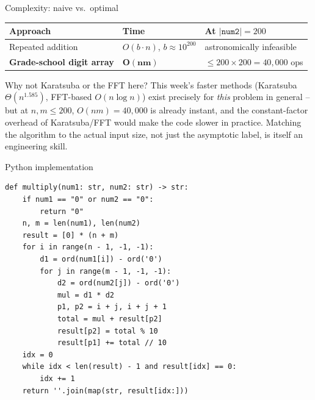 \documentclass[11pt,aspectratio=169]{beamer}
\begin{document}
\begin{frame}{Complexity: naive vs.\ optimal}
  \begin{center}
  \begin{tabular}{@{}lll@{}}
    \toprule
    Approach & Time & At $|\texttt{num2}|=200$ \\
    \midrule
    Repeated addition & $O(b \cdot n)$, $b\approx 10^{200}$ & astronomically infeasible \\
    \textbf{Grade-school digit array} & $\boldsymbol{O(nm)}$ & $\le 200\times200=40{,}000$
    ops \\
    \bottomrule
  \end{tabular}
  \end{center}
  \begin{alertblock}{Why not Karatsuba or the FFT here?}
    This week's faster methods (Karatsuba $\Theta(n^{1.585})$, FFT-based
    $O(n\log n)$) exist precisely for \emph{this} problem in general -- but at
    $n,m\le 200$, $O(nm)=40{,}000$ is already instant, and the constant-factor overhead
    of Karatsuba/FFT would make the code slower in practice. Matching the algorithm to
    the actual input size, not just the asymptotic label, is itself an engineering skill.
  \end{alertblock}
\end{frame}

\begin{frame}[fragile]{Python implementation}
  \begin{lstlisting}[style=py,aboveskip=0pt,belowskip=0pt]
def multiply(num1: str, num2: str) -> str:
    if num1 == "0" or num2 == "0":
        return "0"
    n, m = len(num1), len(num2)
    result = [0] * (n + m)
    for i in range(n - 1, -1, -1):
        d1 = ord(num1[i]) - ord('0')
        for j in range(m - 1, -1, -1):
            d2 = ord(num2[j]) - ord('0')
            mul = d1 * d2
            p1, p2 = i + j, i + j + 1
            total = mul + result[p2]
            result[p2] = total % 10
            result[p1] += total // 10
    idx = 0
    while idx < len(result) - 1 and result[idx] == 0:
        idx += 1
    return ''.join(map(str, result[idx:]))
  \end{lstlisting}
\end{frame}
\end{document}
